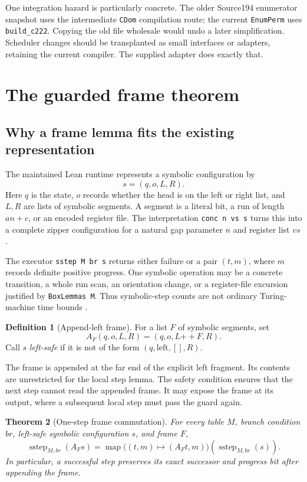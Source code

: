 \documentclass[11pt,letterpaper]{article}
\newtheorem{theorem}{Theorem}[section]
\theoremstyle{definition}
\newtheorem{definition}[theorem]{Definition}
\theoremstyle{remark}
\newcommand{\code}[1]{\texttt{#1}}
\begin{document}
One integration hazard is particularly concrete. The older Source194
enumerator snapshot uses the intermediate \code{CDom} compilation route;
the current \code{EnumPerm} uses \code{build\_c222}. Copying the old file
wholesale would undo a later simplification. Scheduler changes should be
transplanted as small interfaces or adapters, retaining the current compiler.
The supplied adapter does exactly that.

\section{The guarded frame theorem}
\label{sec:frame}

\subsection{Why a frame lemma fits the existing representation}

The maintained Lean runtime represents a symbolic configuration by
\[
 s=(q,o,L,R).
\]
Here $q$ is the state, $o$ records whether the head is on the left or right
list, and $L,R$ are lists of symbolic segments. A segment is a literal bit,
a run of length $a n+c$, or an encoded register file. The interpretation
\code{conc n vs s} turns this into a complete zipper configuration for a
natural gap parameter $n$ and register list $vs$.

The executor \code{sstep M br s} returns either failure or a pair $(t,m)$,
where $m$ records definite positive progress. One symbolic operation may be
a concrete transition, a whole run scan, an orientation change, or a
register-file excursion justified by \code{BoxLemmas M}. Thus symbolic-step
counts are not ordinary Turing-machine time bounds \cite{runtime}.

\begin{definition}[Append-left frame]
For a list $F$ of symbolic segments, set
\[
 A_F(q,o,L,R)=(q,o,L\mathbin{++}F,R).
\]
Call $s$ \emph{left-safe} if it is not of the form $(q,\mathrm{left},[],R)$.
\end{definition}

The frame is appended at the far end of the explicit left fragment. Its
contents are unrestricted for the local step lemma. The safety condition
ensures that the next step cannot read the appended frame. It may expose the
frame at its output, where a subsequent local step must pass the guard again.

\begin{theorem}[One-step frame commutation]
\label{thm:frame}
For every table $M$, branch condition $br$, left-safe symbolic configuration
$s$, and frame $F$,
\[
 \operatorname{sstep}_{M,br}(A_Fs)
 =\operatorname{map}\bigl((t,m)\mapsto(A_Ft,m)\bigr)
       (\operatorname{sstep}_{M,br}(s)).
\]
In particular, a successful step preserves its exact successor and progress
bit after appending the frame.
\end{theorem}
\end{document}
